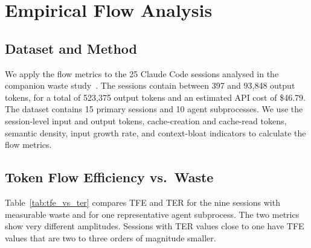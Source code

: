 \documentclass[journal]{IEEEtran}
\begin{document}
\section{Empirical Flow Analysis}
\label{sec:results}

\subsection{Dataset and Method}

We apply the flow metrics to the 25 Claude Code sessions analysed in the companion waste study~\cite{griffin2026ter}. The sessions contain between 397 and 93,848 output tokens, for a total of 523,375 output tokens and an estimated API cost of \$46.79. The dataset contains 15 primary sessions and 10 agent subprocesses. We use the session-level input and output tokens, cache-creation and cache-read tokens, semantic density, input growth rate, and context-bloat indicators to calculate the flow metrics.

\subsection{Token Flow Efficiency vs.\ Waste}

Table~\ref{tab:tfe_vs_ter} compares TFE and TER for the nine sessions with measurable waste and for one representative agent subprocess. The two metrics show very different amplitudes. Sessions with TER values close to one have TFE values that are two to three orders of magnitude smaller.
\end{document}
